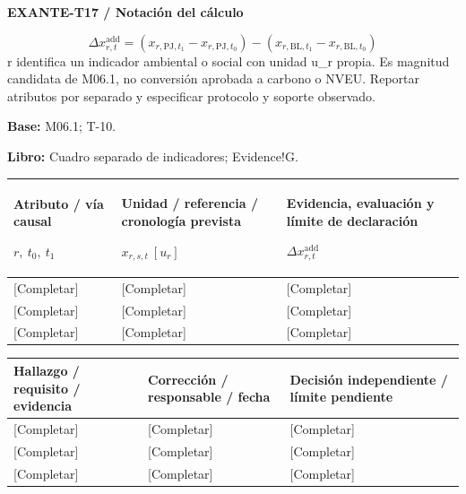 \textbf{EXANTE-T17 / Notación del cálculo}\par
{\fontsize{9}{11}\selectfont\[ \Delta x_{r,t}^{\mathrm{add}}=(x_{r,\mathrm{PJ},t_1}-x_{r,\mathrm{PJ},t_0})-(x_{r,\mathrm{BL},t_1}-x_{r,\mathrm{BL},t_0}) \]}
r identifica un indicador ambiental o social con unidad u\_r propia. Es magnitud candidata de M06.1, no conversión aprobada a carbono o NVEU. Reportar atributos por separado y especificar protocolo y soporte observado.\par
\textbf{Base:} M06.1; T-10.\par
\textbf{Libro:} Cuadro separado de indicadores; Evidence!G.\par\endgroup
{\sffamily\fontsize{8.3}{10.3}\selectfont\begin{longtable}{@{}P{54.83mm} P{54.83mm} P{54.83mm}@{}}
\toprule
\textbf{Atributo / vía causal}\par {\normalfont\fontsize{8.2}{10}\selectfont $r,\ t_0,\ t_1$} & \textbf{Unidad / referencia / cronología prevista}\par {\normalfont\fontsize{8.2}{10}\selectfont $x_{r,s,t}\ [u_r]$} & \textbf{Evidencia, evaluación y límite de declaración}\par {\normalfont\fontsize{8.2}{10}\selectfont $\Delta x_{r,t}^{\mathrm{add}}$}\\\midrule\endhead
\rule{0pt}{8mm}[Completar] & [Completar] & [Completar]\\\hline
\rule{0pt}{8mm}[Completar] & [Completar] & [Completar]\\\hline
\rule{0pt}{8mm}[Completar] & [Completar] & [Completar]\\\hline
\end{longtable}}
{\sffamily\fontsize{8.3}{10.3}\selectfont\begin{longtable}{@{}P{54.83mm} P{54.83mm} P{54.83mm}@{}}
\toprule
\textbf{Hallazgo / requisito / evidencia} & \textbf{Corrección / responsable / fecha} & \textbf{Decisión independiente / límite pendiente}\\\midrule\endhead
\rule{0pt}{8mm}[Completar] & [Completar] & [Completar]\\\hline
\rule{0pt}{8mm}[Completar] & [Completar] & [Completar]\\\hline
\rule{0pt}{8mm}[Completar] & [Completar] & [Completar]\\\hline
\end{longtable}}
